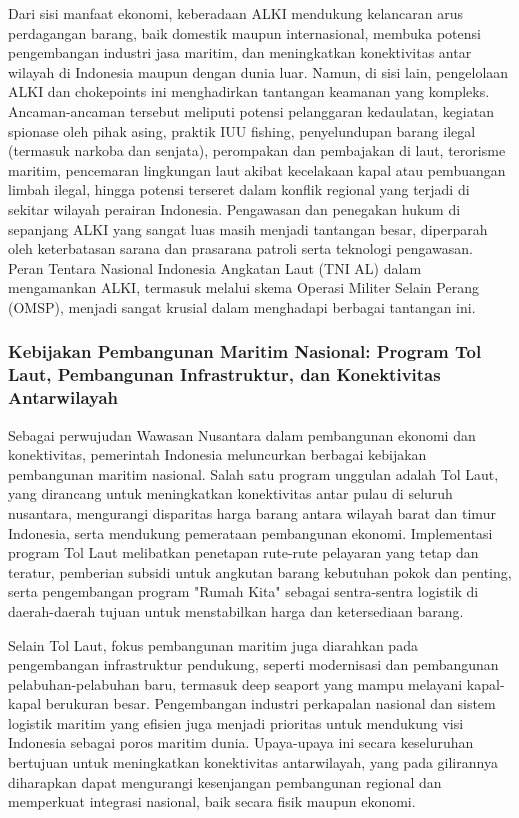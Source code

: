 \documentclass[12pt, a4paper]{article}
\begin{document}
Dari sisi manfaat ekonomi, keberadaan ALKI mendukung kelancaran arus perdagangan barang, baik domestik maupun internasional, membuka potensi pengembangan industri jasa maritim, dan meningkatkan konektivitas antar wilayah di Indonesia maupun dengan dunia luar. Namun, di sisi lain, pengelolaan ALKI dan chokepoints ini menghadirkan tantangan keamanan yang kompleks. Ancaman-ancaman tersebut meliputi potensi pelanggaran kedaulatan, kegiatan spionase oleh pihak asing, praktik IUU fishing, penyelundupan barang ilegal (termasuk narkoba dan senjata), perompakan dan pembajakan di laut, terorisme maritim, pencemaran lingkungan laut akibat kecelakaan kapal atau pembuangan limbah ilegal, hingga potensi terseret dalam konflik regional yang terjadi di sekitar wilayah perairan Indonesia. Pengawasan dan penegakan hukum di sepanjang ALKI yang sangat luas masih menjadi tantangan besar, diperparah oleh keterbatasan sarana dan prasarana patroli serta teknologi pengawasan. Peran Tentara Nasional Indonesia Angkatan Laut (TNI AL) dalam mengamankan ALKI, termasuk melalui skema Operasi Militer Selain Perang (OMSP), menjadi sangat krusial dalam menghadapi berbagai tantangan ini.  

\subsubsection*{Kebijakan Pembangunan Maritim Nasional: Program Tol Laut, Pembangunan Infrastruktur, dan Konektivitas Antarwilayah}

Sebagai perwujudan Wawasan Nusantara dalam pembangunan ekonomi dan konektivitas, pemerintah Indonesia meluncurkan berbagai kebijakan pembangunan maritim nasional. Salah satu program unggulan adalah Tol Laut, yang dirancang untuk meningkatkan konektivitas antar pulau di seluruh nusantara, mengurangi disparitas harga barang antara wilayah barat dan timur Indonesia, serta mendukung pemerataan pembangunan ekonomi. Implementasi program Tol Laut melibatkan penetapan rute-rute pelayaran yang tetap dan teratur, pemberian subsidi untuk angkutan barang kebutuhan pokok dan penting, serta pengembangan program "Rumah Kita" sebagai sentra-sentra logistik di daerah-daerah tujuan untuk menstabilkan harga dan ketersediaan barang.  

Selain Tol Laut, fokus pembangunan maritim juga diarahkan pada pengembangan infrastruktur pendukung, seperti modernisasi dan pembangunan pelabuhan-pelabuhan baru, termasuk deep seaport yang mampu melayani kapal-kapal berukuran besar. Pengembangan industri perkapalan nasional dan sistem logistik maritim yang efisien juga menjadi prioritas untuk mendukung visi Indonesia sebagai poros maritim dunia. Upaya-upaya ini secara keseluruhan bertujuan untuk meningkatkan konektivitas antarwilayah, yang pada gilirannya diharapkan dapat mengurangi kesenjangan pembangunan regional dan memperkuat integrasi nasional, baik secara fisik maupun ekonomi.  
\end{document}
